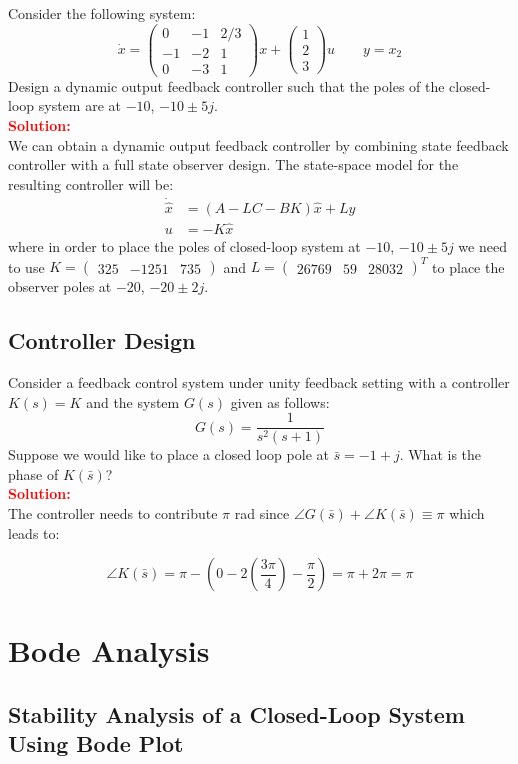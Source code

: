 \documentclass[12pt]{article}
\newcommand{\pmat}[1]{\begin{pmatrix} #1 \end{pmatrix}}
\begin{document}
Consider the following system:
\[
\dot{x}=\pmat{0 & -1 & 2/3 \\ -1 & -2 & 1 \\ 0 & -3 & 1 } x +\pmat{1 \\ 2 \\ 3}u \qquad y=x_2
\]
Design a dynamic output feedback controller such that the poles of the closed-loop system are at $-10$, $-10 \pm 5j$. \\

\textbf{\textcolor{red}{Solution:}} \\
We can obtain a dynamic output feedback controller by combining state feedback controller with a full state observer design. The state-space model for the resulting controller will be:
\begin{equation}
    \begin{split}
        \dot{\hat{x}} &=(A-LC-BK)\hat{x} +L y \\
        u &=-K \hat{x}
    \end{split}
\end{equation}
where in order to place the poles of closed-loop system at $-10$, $-10 \pm 5j$ we need to use $K= \pmat{325 & -1251 & 735}$ and $L=\pmat{26769 & 59 & 28032}^T$ to place the observer poles at $-20$, $-20 \pm 2j$.
\clearpage

\subsection{Controller Design}

Consider a feedback control system under unity feedback setting with a controller $K(s)=K$ and the system $G(s)$ given as follows:
\[
G(s)=\frac{1}{s^2(s+1)}
\]
Suppose we would like to place a closed loop pole at $\bar{s}=-1+j$. What is the phase of $K(\bar{s})$?  \\
\textbf{\textcolor{red}{Solution:}} \\
The controller needs to contribute $\pi $ rad since $\angle G(\bar{s}) +\angle K(\bar{s}) \equiv \pi$ which leads to:

\[
 \angle K(\bar{s}) = \pi - \left( 0 - 2\left( \frac{3 \pi}{4} \right) -\frac{\pi}{2}\right)= \pi +2 \pi =\pi 
\]
\clearpage

\section{Bode Analysis}
\subsection{Stability Analysis of a Closed-Loop System Using Bode Plot}
\end{document}
